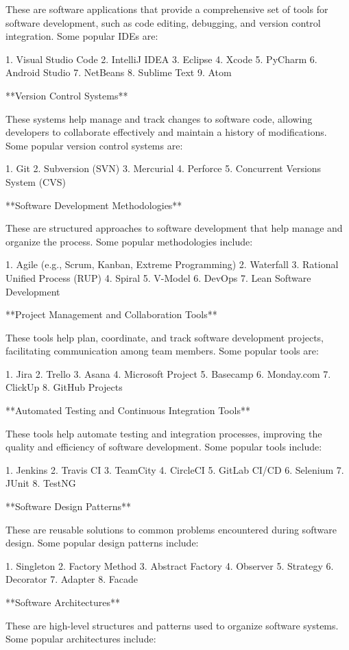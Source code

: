 \documentclass{article}
\begin{document}
These are software applications that provide a comprehensive set of tools for software development, such as code editing, debugging, and version control integration. Some popular IDEs are:

1. Visual Studio Code
2. IntelliJ IDEA
3. Eclipse
4. Xcode
5. PyCharm
6. Android Studio
7. NetBeans
8. Sublime Text
9. Atom

**Version Control Systems**

These systems help manage and track changes to software code, allowing developers to collaborate effectively and maintain a history of modifications. Some popular version control systems are:

1. Git
2. Subversion (SVN)
3. Mercurial
4. Perforce
5. Concurrent Versions System (CVS)

**Software Development Methodologies**

These are structured approaches to software development that help manage and organize the process. Some popular methodologies include:

1. Agile (e.g., Scrum, Kanban, Extreme Programming)
2. Waterfall
3. Rational Unified Process (RUP)
4. Spiral
5. V-Model
6. DevOps
7. Lean Software Development

**Project Management and Collaboration Tools**

These tools help plan, coordinate, and track software development projects, facilitating communication among team members. Some popular tools are:

1. Jira
2. Trello
3. Asana
4. Microsoft Project
5. Basecamp
6. Monday.com
7. ClickUp
8. GitHub Projects

**Automated Testing and Continuous Integration Tools**

These tools help automate testing and integration processes, improving the quality and efficiency of software development. Some popular tools include:

1. Jenkins
2. Travis CI
3. TeamCity
4. CircleCI
5. GitLab CI/CD
6. Selenium
7. JUnit
8. TestNG

**Software Design Patterns**

These are reusable solutions to common problems encountered during software design. Some popular design patterns include:

1. Singleton
2. Factory Method
3. Abstract Factory
4. Observer
5. Strategy
6. Decorator
7. Adapter
8. Facade

**Software Architectures**

These are high-level structures and patterns used to organize software systems. Some popular architectures include:
\end{document}
